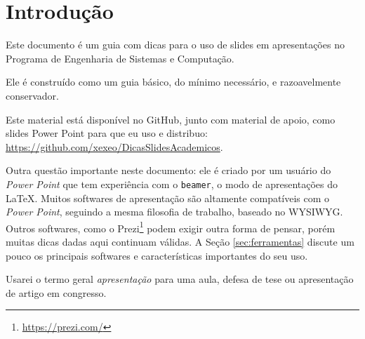\section{Introdução}

Este documento é um guia com dicas para o uso de slides em apresentações no Programa de Engenharia de Sistemas e Computação.

Ele é construído como um guia básico, do mínimo necessário, e razoavelmente conservador.

Este material está disponível no GitHub, junto com material de apoio, como slides Power Point para que eu uso e distribuo: \url{https://github.com/xexeo/DicasSlidesAcademicos}.

Outra questão importante neste documento: ele é criado por um usuário do \textit{Power Point} que tem experiência com o \texttt{beamer}, o modo de apresentações do \LaTeX. Muitos softwares de apresentação são altamente compatíveis com o \textit{Power Point}, seguindo a mesma filosofia de trabalho, baseado no WYSIWYG. Outros softwares, como o Prezi\footnote{\url{https://prezi.com/}} podem exigir outra forma de pensar, porém muitas dicas dadas aqui continuam válidas. A Seção \ref{sec:ferramentas} discute um pouco os principais softwares e características importantes do seu uso.

Usarei o termo geral \textit{apresentação} para uma aula, defesa de tese ou apresentação de artigo em congresso.




